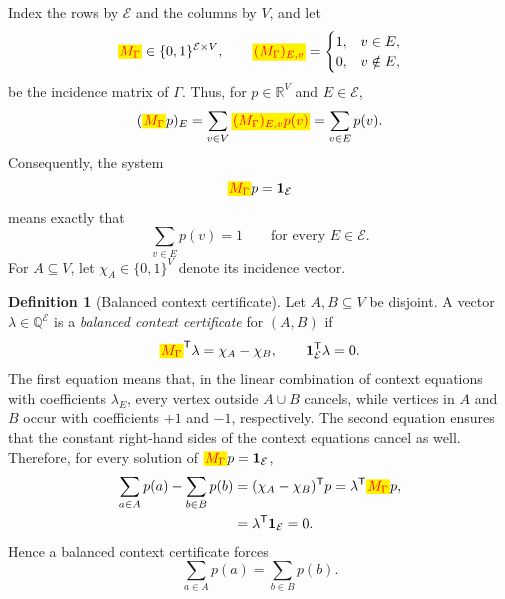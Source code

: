 \documentclass[
  twocolumn,
  aps,
  pra,
  floatfix,
  amsmath,amssymb,
  longbibliography
]{revtex4-2}
\theoremstyle{definition}
\newtheorem{definition}[theorem]{Definition}
\theoremstyle{remark}
\newcommand{\E}{\mathcal E}
\newcommand{\one}{\mathbf 1}
\newcommand{\corrmath}[1]{\begingroup\setlength{\fboxsep}{1pt}\colorbox{yellow}{\ensuremath{\color{red}#1}}\endgroup}
\begin{document}
Index the rows by $\E$ and the columns by $V$, and let
\begin{equation}
 \corrmath{M_\Gamma}
 \in\{0,1\}^{\E\times V},\qquad
 \corrmath{(M_\Gamma)_{E,v}}=
 \begin{cases}
  1,&v\in E,\\
  0,&v\notin E,
 \end{cases}
 \label{eq:incidence}
\end{equation}
be the incidence matrix of $\Gamma$.  Thus, for
$p\in\mathbb R^V$ and $E\in\E$,
\[
 (\corrmath{M_\Gamma}p)_E
 =\sum_{v\in V}\corrmath{(M_\Gamma)_{E,v}p(v)}
 =\sum_{v\in E}p(v).
\]
Consequently, the system
\begin{equation}
  \corrmath{M_\Gamma}p=\one_\E
  \label{eq:matrix-normalization}
\end{equation}
means exactly that
\[
 \sum_{v\in E}p(v)=1
 \qquad\text{for every }E\in\E.
\]
For $A\subseteq V$, let $\chi_A\in\{0,1\}^{V}$ denote its incidence vector.
\begin{definition}[Balanced context certificate]
Let $A,B\subseteq V$ be disjoint.  A vector
$\lambda\in\mathbb Q^{\E}$ is a \emph{balanced context certificate} for
$(A,B)$ if
\begin{equation}
 \corrmath{M_\Gamma}^{\mathsf T}\lambda=\chi_A-\chi_B,
 \qquad
 \one_\E^{\mathsf T}\lambda=0.
 \label{eq:certificate}
\end{equation}
The first equation means that, in the linear combination of context
equations with coefficients $\lambda_E$, every vertex outside
$A\cup B$ cancels, while vertices in $A$ and $B$ occur with coefficients
$+1$ and $-1$, respectively.  The second equation ensures that the
constant right-hand sides of the context equations cancel as well.
Therefore, for every solution of $\corrmath{M_\Gamma}p=\one_\E$,
\begin{align*}
 \sum_{a\in A}p(a)-\sum_{b\in B}p(b)
 &= (\chi_A-\chi_B)^{\mathsf T}p
  = \lambda^{\mathsf T}\corrmath{M_\Gamma}p,\\
 &= \lambda^{\mathsf T}\one_\E
  = 0.
\end{align*}
Hence a balanced context certificate forces
\[
 \sum_{a\in A}p(a)=\sum_{b\in B}p(b).
\]
\end{definition}
\end{document}
